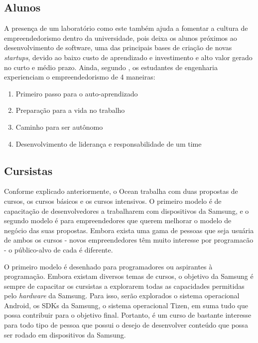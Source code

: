 \subsection{Alunos}
\label{sec:con_alunos}

A presença de um laboratório como este também ajuda a fomentar a cultura de empreendedorismo dentro da universidade, pois deixa os alunos próximos ao desenvolvimento de software, uma das principais bases de criação de novas \textit{startups}, devido ao baixo custo de aprendizado e investimento e alto valor gerado no curto e médio prazo. Ainda, segundo , os estudantes de engenharia experienciam o empreendedorismo de 4 maneiras: 

\begin{enumerate}
\item Primeiro passo para o auto-aprendizado
\item Preparação para a vida no trabalho
\item Caminho para ser autônomo
\item Desenvolvimento de liderança e responsabilidade de um time
\end{enumerate}

\subsection{Cursistas}
\label{sec:con_cursistas}

Conforme explicado anteriormente, o Ocean trabalha com duas propostas de cursos, os cursos básicos e os cursos intensivos. O primeiro modelo é de capacitação de desenvolvedores a trabalharem com dispositivos da Samsung, e o segundo modelo é para empreendedores que querem melhorar o modelo de negócio das suas propostas. Embora exista uma gama de pessoas que seja usuária de ambos os cursos - novos empreendedores têm muito interesse por programacão - o público-alvo de cada é diferente.

O primeiro modelo é desenhado para programadores ou aspirantes à programação. Embora existam diversos temas de cursos, o objetivo da Samsung é sempre de capacitar os cursistas a explorarem todas as capacidades permitidas pelo \textit{hardware} da Samsung. Para isso, serão explorados o sistema operacional Android, os SDKs da Samsung, o sistema operacional Tizen, em suma tudo que possa contribuir para o objetivo final. Portanto, é um curso de bastante interesse para todo tipo de pessoa que possui o desejo de desenvolver conteúdo que possa ser rodado em dispositivos da Samsung.

